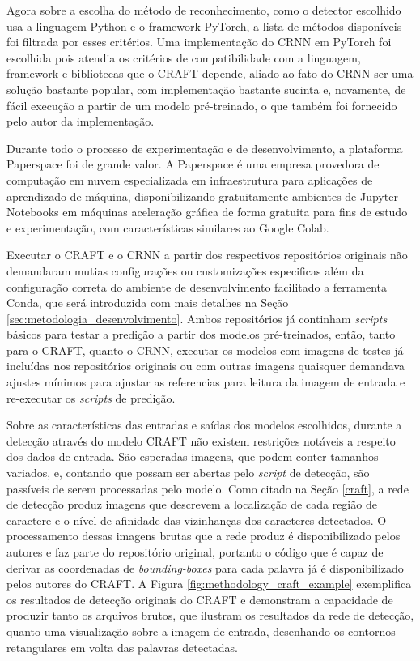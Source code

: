 Agora sobre a escolha do método de reconhecimento, como o detector escolhido usa a linguagem Python e o framework PyTorch, a lista de métodos disponíveis foi filtrada por esses critérios. Uma implementação do CRNN em PyTorch foi escolhida pois atendia os critérios de compatibilidade com a linguagem, framework e bibliotecas que o CRAFT depende, aliado ao fato do CRNN ser uma solução bastante popular, com implementação bastante sucinta e, novamente, de fácil execução a partir de um modelo pré-treinado, o que também foi fornecido pelo autor da implementação.

Durante todo o processo de experimentação e de desenvolvimento, a plataforma Paperspace foi de grande valor. A Paperspace é uma empresa provedora de computação em nuvem especializada em infraestrutura para aplicações de aprendizado de máquina, disponibilizando gratuitamente ambientes de Jupyter Notebooks em máquinas aceleração gráfica de forma gratuita para fins de estudo e experimentação, com características similares ao Google Colab.

Executar o CRAFT e o CRNN a partir dos respectivos repositórios originais não demandaram mutias configurações ou customizações especificas além da configuração correta do ambiente de desenvolvimento facilitado a ferramenta Conda, que será introduzida com mais detalhes na Seção \ref{sec:metodologia_desenvolvimento}. Ambos repositórios já continham \textit{scripts} básicos para testar a predição a partir dos modelos pré-treinados, então, tanto para o CRAFT, quanto o CRNN, executar os modelos com imagens de testes já incluídas nos repositórios originais ou com outras imagens quaisquer demandava ajustes mínimos para ajustar as referencias para leitura da imagem de entrada e re-executar os \textit{scripts} de predição.

Sobre as características das entradas e saídas dos modelos escolhidos, durante a detecção através do modelo CRAFT não existem restrições notáveis a respeito dos dados de entrada. São esperadas imagens, que podem conter tamanhos variados, e, contando que possam ser abertas pelo \textit{script} de detecção, são passíveis de serem processadas pelo modelo. Como citado na Seção \ref{craft}, a rede de detecção produz imagens que descrevem a localização de cada região de caractere e o nível de afinidade das vizinhanças dos caracteres detectados. O processamento dessas imagens brutas que a rede produz é disponibilizado pelos autores e faz parte do repositório original, portanto o código que é capaz de derivar as coordenadas de \textit{bounding-boxes} para cada palavra já é disponibilizado pelos autores do CRAFT. A Figura \ref{fig:methodology_craft_example} exemplifica os resultados de detecção originais do CRAFT e demonstram a capacidade de produzir tanto os arquivos brutos, que ilustram os resultados da rede de detecção, quanto uma visualização sobre a imagem de entrada, desenhando os contornos retangulares em volta das palavras detectadas.

